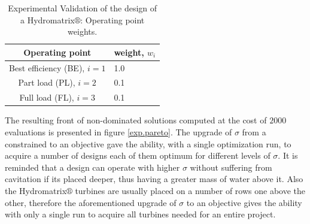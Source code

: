 \begin{table}[h!]
\begin{center}
\begin{tabular}{ |c|l| }
\hline
Operating point & weight, $w_i$\\
\hline
Best efficiency (BE), $i\!=\!1$  & 1.0\\
\hline
Part load  (PL), $i\!=\!2$ & 0.1\\
\hline
Full load (FL), $i\!=\!3$  & 0.1\\
\hline
\end{tabular}
\caption{Experimental Validation of the design of a Hydromatrix$\circledR$: Operating point weights.}
\label{exp.weights}
\end{center}
\end{table}

The resulting front of non-dominated solutions computed at the cost of $2000$ evaluations is presented in figure \ref{exp.pareto}. The upgrade of $\sigma$ from a constrained to an objective gave the ability, with a single optimization run, to acquire a number of designs each of them optimum for different levels of $\sigma$. It is reminded that a design can operate with higher $\sigma$ without suffering from cavitation if its placed deeper, thus having a greater mass of water above it. Also the Hydromatrix$\circledR$ turbines are usually placed on a number of rows one above the other, therefore the aforementioned upgrade of $\sigma$ to an objective gives the ability with only a single run to acquire all turbines needed for an entire project. 

